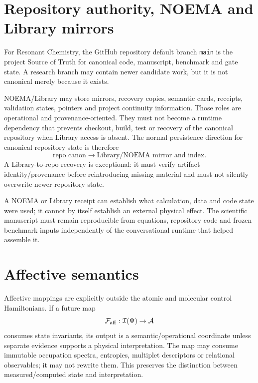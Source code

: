 \section{Repository authority, NOEMA and Library mirrors}
For Resonant Chemistry, the GitHub repository default branch \texttt{main} is the project Source of Truth for canonical code, manuscript, benchmark and gate state.  A research branch may contain newer candidate work, but it is not canonical merely because it exists.

NOEMA/Library may store mirrors, recovery copies, semantic cards, receipts, validation states, pointers and project continuity information.  Those roles are operational and provenance-oriented.  They must not become a runtime dependency that prevents checkout, build, test or recovery of the canonical repository when Library access is absent.  The normal persistence direction for canonical repository state is therefore
\begin{equation}
\text{repo canon}\longrightarrow\text{Library/NOEMA mirror and index}.
\end{equation}
A Library-to-repo recovery is exceptional: it must verify artifact identity/provenance before reintroducing missing material and must not silently overwrite newer repository state.

A NOEMA or Library receipt can establish what calculation, data and code state were used; it cannot by itself establish an external physical effect.  The scientific manuscript must remain reproducible from equations, repository code and frozen benchmark inputs independently of the conversational runtime that helped assemble it.

\section{Affective semantics}
Affective mappings are explicitly outside the atomic and molecular control Hamiltonians.  If a future map
\begin{equation}
\mathcal F_{\rm aff}:\mathcal I(\Psi)\rightarrow\mathcal A
\end{equation}
consumes state invariants, its output is a semantic/operational coordinate unless separate evidence supports a physical interpretation.  The map may consume immutable occupation spectra, entropies, multiplet descriptors or relational observables; it may not rewrite them.  This preserves the distinction between measured/computed state and interpretation.

